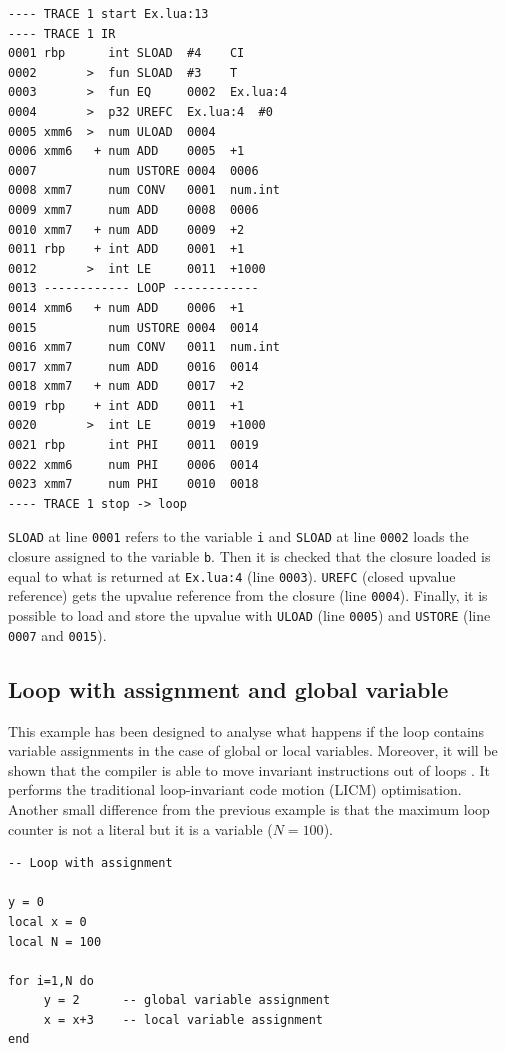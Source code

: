 \begin{multicols}{2}
\begin{lstlisting}[style=DumpStyle]
---- TRACE 1 start Ex.lua:13
---- TRACE 1 IR
0001 rbp      int SLOAD  #4    CI
0002       >  fun SLOAD  #3    T
0003       >  fun EQ     0002  Ex.lua:4
0004       >  p32 UREFC  Ex.lua:4  #0  
0005 xmm6  >  num ULOAD  0004
0006 xmm6   + num ADD    0005  +1  
0007          num USTORE 0004  0006
0008 xmm7     num CONV   0001  num.int
0009 xmm7     num ADD    0008  0006
0010 xmm7   + num ADD    0009  +2  
0011 rbp    + int ADD    0001  +1  
0012       >  int LE     0011  +1000
0013 ------------ LOOP ------------
0014 xmm6   + num ADD    0006  +1  
0015          num USTORE 0004  0014
0016 xmm7     num CONV   0011  num.int
0017 xmm7     num ADD    0016  0014
0018 xmm7   + num ADD    0017  +2  
0019 rbp    + int ADD    0011  +1  
0020       >  int LE     0019  +1000
0021 rbp      int PHI    0011  0019
0022 xmm6     num PHI    0006  0014
0023 xmm7     num PHI    0010  0018
---- TRACE 1 stop -> loop
\end{lstlisting}
\end{multicols}

\noindent
\texttt{SLOAD} at line \texttt{0001} refers to the variable \texttt{i} and \texttt{SLOAD} at line \texttt{0002} loads the closure assigned to the variable \texttt{b}. Then it is checked that the closure loaded is equal to what is returned at \texttt{Ex.lua:4} (line \texttt{0003}). \texttt{UREFC} (closed upvalue reference) gets the upvalue reference from the closure (line \texttt{0004}). Finally, it is possible to load and store the upvalue with \texttt{ULOAD} (line \texttt{0005}) and \texttt{USTORE} (line \texttt{0007} and \texttt{0015}).
 

\iffalse

\subsection{Loop with assignment and global variable}
This example has been designed to analyse what happens if the loop contains variable assignments in the case of global or local variables. Moreover, it will be shown that the compiler is able to move invariant instructions out of loops \cite{lj-mail-understand-ir}. It performs the traditional loop-invariant code motion (LICM) optimisation. Another small difference from the previous example is that the maximum loop counter is not a literal but it is a variable ($N=100$). 
\begin{mdframed}[style=LuaStyleFrame]
\begin{lstlisting}[style=LuaStyle]
-- Loop with assignment

y = 0
local x = 0
local N = 100

for i=1,N do
	 y = 2      -- global variable assignment
	 x = x+3    -- local variable assignment
end
\end{lstlisting}
\end{mdframed}

